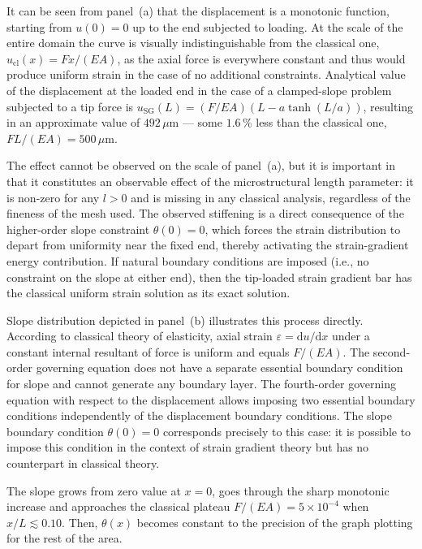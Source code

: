 \documentclass[final,3p,times,fleqn]{elsarticle}
\begin{document}
It can be seen from panel~(a) that the displacement is a monotonic function,
starting from $u(0) = 0$ up to the end subjected to loading.
At the scale of the entire domain the curve is visually indistinguishable from the classical one,
$u_{\mathrm{cl}}(x) = Fx/(EA)$, as the axial force is everywhere constant and thus would produce
uniform strain in the case of no additional constraints.
Analytical value of the displacement at the loaded end in the case of a clamped-slope problem
subjected to a tip force is $u_{\mathrm{SG}}(L) = (F/EA)(L - a\tanh(L/a))$, resulting
in an approximate value of $492\,\mu\mathrm{m}$ --- some $1.6\,\%$ less than the classical
one, $FL/(EA) = 500\,\mu\mathrm{m}$.

The effect cannot be observed on the scale of panel~(a),
but it is important in that it constitutes an observable effect of the
microstructural length parameter: it is non-zero for any $l > 0$ and
is missing in any classical analysis, regardless of the fineness of the mesh used.
The observed stiffening is a direct consequence of the higher-order slope constraint $\theta(0)=0$, which forces the strain distribution to depart from uniformity near the fixed end, thereby activating the strain-gradient energy contribution. If natural boundary conditions are imposed (i.e., no constraint on
the slope at either end), then the tip-loaded strain gradient bar
has the classical uniform strain solution as its exact solution.


Slope distribution depicted in panel~(b) illustrates this process
directly.
According to classical theory of elasticity, axial strain
$\varepsilon = \mathrm{d}u/\mathrm{d}x$ under a constant internal
resultant of force is uniform and equals $F/(EA)$. The second-order
governing equation does not have a separate essential boundary
condition for slope and cannot generate any boundary layer.
The fourth-order governing equation with respect to the displacement
allows imposing two essential boundary conditions independently of
the displacement boundary conditions.
The slope boundary condition $\theta(0)=0$ corresponds precisely to
this case: it is possible to impose this condition in the context of
strain gradient theory but has no counterpart in classical theory.


The slope grows from zero value at $x=0$, goes through the sharp monotonic
increase and approaches the classical plateau $F/(EA)=5 \times 10^{-4}$
when $x/L \lesssim 0.10$. 
Then, $\theta(x)$ becomes constant to the precision of the graph
plotting for the rest of the area. 
\end{document}
